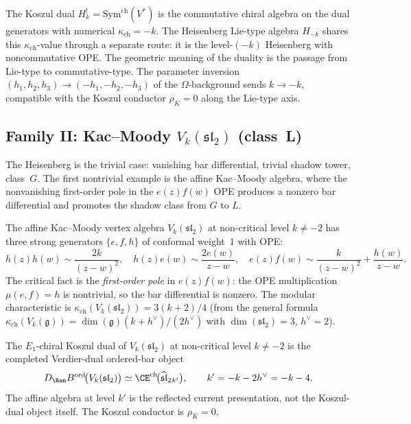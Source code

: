 \begin{remark}
\label{rem:heisenberg-koszul-not-level-inversion}
The Koszul dual $H_k^! = \mathrm{Sym}^{\mathrm{ch}}(V^*)$ is the
commutative chiral algebra on the dual generators with numerical
$\kappa_{\mathrm{ch}} = -k$. The Heisenberg Lie-type algebra $H_{-k}$
shares this $\kappa_{\mathrm{ch}}$-value through a separate route: it
is the level-$(-k)$ Heisenberg with noncommutative OPE. The geometric
meaning of the duality is the passage from Lie-type to
commutative-type. The parameter inversion
$(h_1, h_2, h_3) \to (-h_1, -h_2, -h_3)$ of the $\Omega$-background
sends $k \to -k$, compatible with the Koszul conductor $\rho_K = 0$
along the Lie-type axis.
\end{remark}

\subsection{Family II: Kac--Moody \texorpdfstring{$V_k(\mathfrak{sl}_2)$}{V-k(sl-2)} (class~L)}
\label{subsec:koszul-kac-moody}

The Heisenberg is the trivial case: vanishing bar differential, trivial shadow tower, class~$G$. The first nontrivial example is the affine Kac--Moody algebra, where the nonvanishing first-order pole in the $e(z)f(w)$ OPE produces a nonzero bar differential and promotes the shadow class from $G$ to $L$.

The affine Kac--Moody vertex algebra $V_k(\mathfrak{sl}_2)$ at
non-critical level $k \neq -2$ has three strong generators
$\{e, f, h\}$ of conformal weight~$1$ with OPE:
\begin{equation}\label{eq:sl2-ope}
 h(z)h(w) \sim \frac{2k}{(z-w)^2}, \quad
 h(z)e(w) \sim \frac{2e(w)}{z-w}, \quad
 e(z)f(w) \sim \frac{k}{(z-w)^2} + \frac{h(w)}{z-w}.
\end{equation}
The critical fact is the \emph{first-order pole} in $e(z)f(w)$: the
OPE multiplication $\mu(e, f) = h$ is nontrivial, so the bar
differential is nonzero. The modular characteristic is
$\kappa_{\mathrm{ch}}(V_k(\mathfrak{sl}_2)) = 3(k+2)/4$ (from the
general formula $\kappa_{\mathrm{ch}}(V_k(\mathfrak{g})) =
\dim(\mathfrak{g})(k + h^\vee)/(2h^\vee)$ with $\dim(\mathfrak{sl}_2) = 3$,
$h^\vee = 2$).

\begin{proposition}
\label{prop:koszul-kac-moody}
The $E_1$-chiral Koszul dual of $V_k(\mathfrak{sl}_2)$ at non-critical
level $k \neq -2$ is the completed Verdier-dual ordered-bar object
\[
D_{\Ran}B^{\mathrm{ord}}\!\bigl(V_k(\mathfrak{sl}_2)\bigr)
\simeq
\CE^{\mathrm{ch}}\!\bigl(\widehat{\mathfrak{sl}}_2{}_{k'}\bigr),
\qquad
k' = -k - 2h^\vee = -k - 4.
\]
The affine algebra at level $k'$ is the reflected current presentation,
not the Koszul-dual object itself. The Koszul conductor is
$\rho_K = 0$.
\end{proposition}

